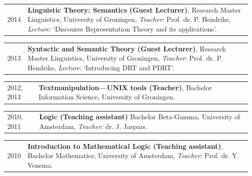\documentclass[a4paper,10pt]{article}
\def\leftcolwidth{.12\textwidth}
\def\tablevspace{10pt}
\begin{document}
\vspace{\tablevspace}

\noindent
\begin{tabularx}{\textwidth}{ p{\leftcolwidth} X }
  2014
  & \textbf{Linguistic Theory: Semantics (Guest Lecturer)}, 
    Research Master Linguistics, University of Groningen,
    \textit{Teacher}: Prof. dr. P. Hendriks,
    \textit{Lecture}: `Discourse Representation Theory and its applications'.
\end{tabularx}

\vspace{\tablevspace}

\noindent
\begin{tabularx}{\textwidth}{ p{\leftcolwidth} X }
  2013
  & \textbf{Syntactic and Semantic Theory (Guest Lecturer)},
    Research Master Linguistics, University of Groningen,
    \textit{Teacher}: Prof. dr. P. Hendriks,
    \textit{Lecture}: `Introducing DRT and PDRT'.
\end{tabularx}

\vspace{\tablevspace}

\noindent
\begin{tabularx}{\textwidth}{ p{\leftcolwidth} X }
  2012, 2013
  & \textbf{Textmanipulation---UNIX tools (Teacher)}, 
    Bachelor Information Science, University of Groningen.\\
\end{tabularx}

\vspace{\tablevspace}

\vspace{\tablevspace}

\noindent
\begin{tabularx}{\textwidth}{ p{\leftcolwidth} X }
  2010, 2011
  & \textbf{Logic (Teaching assistant)}
    Bachelor Beta-Gamma, University of Amsterdam,
    \textit{Teacher}: dr. J. Jaspars.
\end{tabularx}

\vspace{\tablevspace}

\noindent
\begin{tabularx}{\textwidth}{ p{\leftcolwidth} X }
  2010
  & \textbf{Introduction to Mathematical Logic (Teaching assistant)},
    Bachelor Mathematics, University of Amsterdam,
    \textit{Teacher}: Prof. dr. Y. Venema.\\
\end{tabularx}
\end{document}
